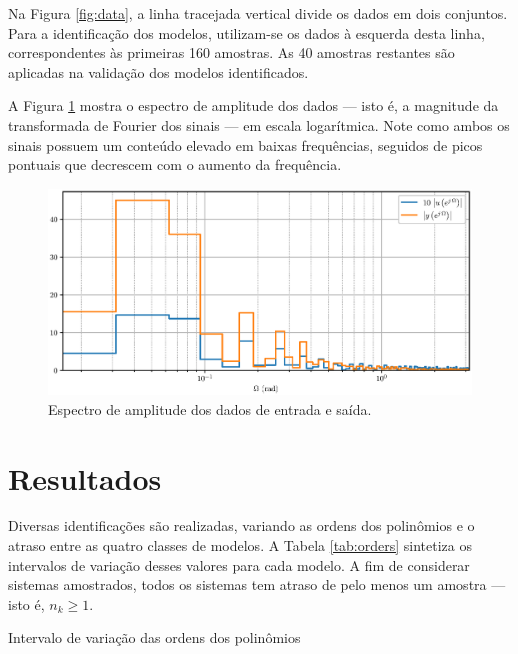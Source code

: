 \documentclass{ppgeesa}
\begin{document}
Na Figura \ref{fig:data}, a linha tracejada vertical divide os dados em dois conjuntos.
Para a identificação dos modelos, utilizam-se os dados à esquerda desta linha, correspondentes às primeiras 160 amostras.
As 40 amostras restantes são aplicadas na validação dos modelos identificados.

A Figura \ref{fig:data_fourier} mostra o espectro de amplitude dos dados --- isto é, a magnitude da transformada de Fourier dos sinais --- em escala logarítmica.
Note como ambos os sinais possuem um conteúdo elevado em baixas frequências, seguidos de picos pontuais que decrescem com o aumento da frequência.
\begin{figure}[!htbp]
  \centering
  \includegraphics[width=\linewidth]{data_fourier_log}
  \caption{Espectro de amplitude dos dados de entrada e saída.}
  \label{fig:data_fourier}
\end{figure}

\section{Resultados}

Diversas identificações são realizadas, variando as ordens dos polinômios e o atraso entre as quatro classes de modelos.
A Tabela \ref{tab:orders} sintetiza os intervalos de variação desses valores para cada modelo.
A fim de considerar sistemas amostrados, todos os sistemas tem atraso de pelo menos um amostra --- isto é, $n_k \geq 1$.

\begin{table}[!htbp]
  \centering
  \caption{Intervalo de variação das ordens dos polinômios}
  \label{tab:orders}
  
\end{table}
\end{document}
